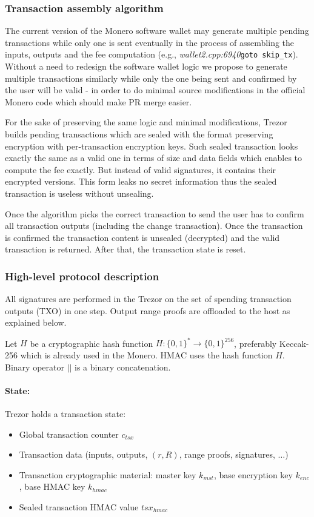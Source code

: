 \documentclass[]{article}
\begin{document}
\subsubsection{Transaction assembly algorithm}

The current version of the Monero software wallet may generate multiple pending transactions while only one is sent eventually in the process of assembling the inputs, outputs and the fee computation (e.g., \emph{wallet2.cpp:6940}\;\verb|goto skip_tx|). Without a need to redesign the software wallet logic we propose to generate multiple transactions similarly while only the one being sent and confirmed by the user will be valid - in order to do minimal source modifications in the official Monero code which should make PR merge easier. 

For the sake of preserving the same logic and minimal modifications, Trezor builds pending transactions which are sealed with the format preserving encryption with per-transaction encryption keys. Such sealed transaction looks exactly the same as a valid one in terms of size and data fields which enables to compute the fee exactly. But instead of valid signatures, it contains their encrypted versions. This form leaks no secret information thus the sealed transaction is useless without unsealing.  

Once the algorithm picks the correct transaction to send the user has to confirm all transaction outputs (including the change transaction). Once the transaction is confirmed the transaction content is unsealed (decrypted) and the valid transaction is returned. After that, the transaction state is reset.


\subsubsection{High-level protocol description} 
All signatures are performed in the Trezor on the set of spending transaction outputs (TXO) in one step. Output range proofs are offloaded to the host as explained below.

Let $H$ be a cryptographic hash function $H : \{0,1\}^* \rightarrow \{0,1\}^{256}$, preferably Keccak-256 which is already used in the Monero. HMAC uses the hash function $H$. Binary operator $||$ is a binary concatenation.

\paragraph{State:}
Trezor holds a transaction state:
\begin{itemize}
	\item Global transaction counter $c_{tsx}$
	\item Transaction data (inputs, outputs, $(r,R)$, range proofs, signatures, $\dots$)
	\item Transaction cryptographic material: master key $k_{mst}$, base encryption key $k_{enc}$, base HMAC key $k_{hmac}$
	\item Sealed transaction HMAC value $tsx_{hmac}$
\end{itemize}
\end{document}
